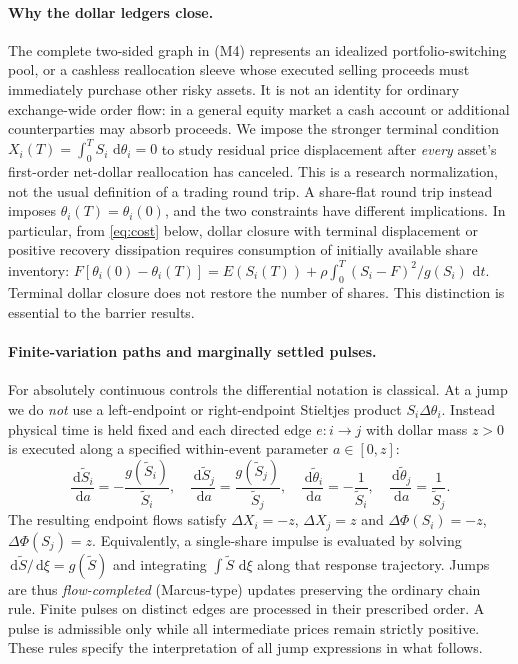 \documentclass[11pt]{article}
\numberwithin{equation}{section}
\theoremstyle{definition}
\theoremstyle{remark}
\newcommand{\dd}{\,\mathrm{d}}
\begin{document}
\paragraph{Why the dollar ledgers close.}
The complete two-sided graph in (M4) represents an idealized portfolio-switching pool, or a cashless reallocation sleeve whose executed selling proceeds must immediately purchase other risky assets. It is not an identity for ordinary exchange-wide order flow: in a general equity market a cash account or additional counterparties may absorb proceeds. We impose the stronger terminal condition $X_i(T)=\int_0^T S_i\,\dd\theta_i=0$ to study residual price displacement after \emph{every} asset's first-order net-dollar reallocation has canceled. This is a research normalization, not the usual definition of a trading round trip. A share-flat round trip instead imposes $\theta_i(T)=\theta_i(0)$, and the two constraints have different implications. In particular, from \eqref{eq:cost} below, dollar closure with terminal displacement or positive recovery dissipation requires consumption of initially available share inventory: $F[\theta_i(0)-\theta_i(T)]=E(S_i(T))+\rho\int_0^T(S_i-F)^2/g(S_i)\,\dd t$. Terminal dollar closure does not restore the number of shares. This distinction is essential to the barrier results.

\paragraph{Finite-variation paths and marginally settled pulses.}
For absolutely continuous controls the differential notation is classical. At a jump we do \emph{not} use a left-endpoint or right-endpoint Stieltjes product $S_i\Delta\theta_i$. Instead physical time is held fixed and each directed edge $e:i\to j$ with dollar mass $z>0$ is executed along a specified within-event parameter $a\in[0,z]$:
\begin{equation}\label{eq:pulse-flow}
\frac{\dd \widetilde S_i}{\dd a}=-\frac{g(\widetilde S_i)}{\widetilde S_i},\quad
\frac{\dd \widetilde S_j}{\dd a}=\frac{g(\widetilde S_j)}{\widetilde S_j},\quad
\frac{\dd\widetilde\theta_i}{\dd a}=-\frac{1}{\widetilde S_i},\quad
\frac{\dd\widetilde\theta_j}{\dd a}=\frac{1}{\widetilde S_j}.
\end{equation}
The resulting endpoint flows satisfy $\Delta X_i=-z$, $\Delta X_j=z$ and $\Delta\Phi(S_i)=-z$, $\Delta\Phi(S_j)=z$. Equivalently, a single-share impulse is evaluated by solving $\dd\widetilde S/\dd\xi=g(\widetilde S)$ and integrating $\int\widetilde S\,\dd\xi$ along that response trajectory. Jumps are thus \emph{flow-completed} (Marcus-type) updates preserving the ordinary chain rule. Finite pulses on distinct edges are processed in their prescribed order. A pulse is admissible only while all intermediate prices remain strictly positive. These rules specify the interpretation of all jump expressions in what follows.
\end{document}
